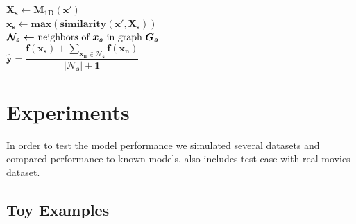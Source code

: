\documentclass[a4paper]{article}
\begin{document}
\begin{algorithmic}
\small
\State $\boldsymbol {  X_s \leftarrow M_{1D}(x')}$\\

\State  $\boldsymbol {x_s\leftarrow max(similarity(x',X_s))}$\\


\State $\boldsymbol {\mathcal{N}_s\leftarrow$  neighbors of $ x_s $ in graph $G_s}$\\


\State $\boldsymbol {\hat y = \dfrac{f(x_s) + \sum\limits_{x_n \in \mathcal{N}_s} f(x_n)}
{\vert \mathcal{N}_s \vert +1}} $\\
 \end{algorithmic}
\pagebreak


\newpage 
\section{Experiments}
In order to test the model performance we simulated several datasets
and compared performance to known models.
also includes test case with real movies dataset.
\subsection{Toy Examples}
\end{document}
